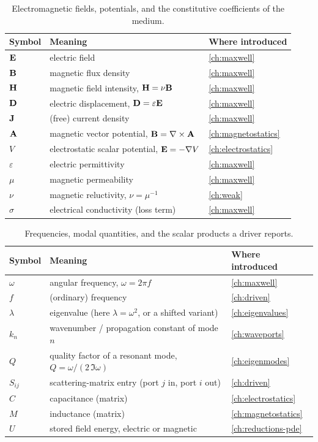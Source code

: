 \begin{table}[ht]
\centering
\small
\caption[Fields and material coefficients]{Electromagnetic fields, potentials,
and the constitutive coefficients of the medium.}
\label{tab:gl-fields}
\begin{tabular}{@{}lll@{}}
\toprule
Symbol & Meaning & Where introduced \\
\midrule
$\mathbf{E}$ & electric field & \cref{ch:maxwell} \\
$\mathbf{B}$ & magnetic flux density & \cref{ch:maxwell} \\
$\mathbf{H}$ & magnetic field intensity, $\mathbf{H}=\nu\mathbf{B}$ & \cref{ch:maxwell} \\
$\mathbf{D}$ & electric displacement, $\mathbf{D}=\varepsilon\mathbf{E}$ & \cref{ch:maxwell} \\
$\mathbf{J}$ & (free) current density & \cref{ch:maxwell} \\
$\mathbf{A}$ & magnetic vector potential, $\mathbf{B}=\nabla\times\mathbf{A}$ & \cref{ch:magnetostatics} \\
$V$ & electrostatic scalar potential, $\mathbf{E}=-\nabla V$ & \cref{ch:electrostatics} \\
$\varepsilon$ & electric permittivity & \cref{ch:maxwell} \\
$\mu$ & magnetic permeability & \cref{ch:maxwell} \\
$\nu$ & magnetic reluctivity, $\nu=\mu^{-1}$ & \cref{ch:weak} \\
$\sigma$ & electrical conductivity (loss term) & \cref{ch:maxwell} \\
\bottomrule
\end{tabular}
\end{table}

\begin{table}[ht]
\centering
\small
\caption[Scalar outputs and modal quantities]{Frequencies, modal quantities, and
the scalar products a driver reports.}
\label{tab:gl-outputs}
\begin{tabular}{@{}lll@{}}
\toprule
Symbol & Meaning & Where introduced \\
\midrule
$\omega$ & angular frequency, $\omega=2\pi f$ & \cref{ch:maxwell} \\
$f$ & (ordinary) frequency & \cref{ch:driven} \\
$\lambda$ & eigenvalue (here $\lambda=\omega^2$, or a shifted variant) & \cref{ch:eigenvalues} \\
$k_n$ & wavenumber / propagation constant of mode $n$ & \cref{ch:waveports} \\
$Q$ & quality factor of a resonant mode, $Q=\omega/(2\,\Im\omega)$ & \cref{ch:eigenmodes} \\
$S_{ij}$ & scattering-matrix entry (port $j$ in, port $i$ out) & \cref{ch:driven} \\
$C$ & capacitance (matrix) & \cref{ch:electrostatics} \\
$M$ & inductance (matrix) & \cref{ch:magnetostatics} \\
$U$ & stored field energy, electric or magnetic & \cref{ch:reductions-pde} \\
\bottomrule
\end{tabular}
\end{table}


